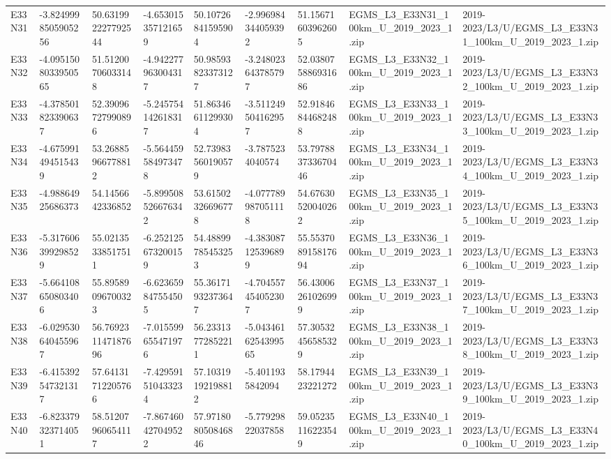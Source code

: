 \begin{landscape}
\begin{longtable}{lllllllll}
E33N31 & -3.8249998505905256 & 50.631992227792544 & -4.653015357121659 & 50.10726841595904 & -2.996984344059392 & 51.15671603962605 & EGMS\_L3\_E33N31\_100km\_U\_2019\_2023\_1.zip & 2019-2023/L3/U/EGMS\_L3\_E33N31\_100km\_U\_2019\_2023\_1.zip \\
E33N32 & -4.0951508033950565 & 51.51200706033148 & -4.942277963004317 & 50.98593823373127 & -3.248023643785797 & 52.038075886931686 & EGMS\_L3\_E33N32\_100km\_U\_2019\_2023\_1.zip & 2019-2023/L3/U/EGMS\_L3\_E33N32\_100km\_U\_2019\_2023\_1.zip \\
E33N33 & -4.378501823390637 & 52.39096727990896 & -5.245754142618317 & 51.86346611299304 & -3.511249504162957 & 52.91846844682488 & EGMS\_L3\_E33N33\_100km\_U\_2019\_2023\_1.zip & 2019-2023/L3/U/EGMS\_L3\_E33N33\_100km\_U\_2019\_2023\_1.zip \\
E33N34 & -4.675991494515439 & 53.26885966778812 & -5.564459584973478 & 52.73983560190579 & -3.7875234040574 & 53.797883733670446 & EGMS\_L3\_E33N34\_100km\_U\_2019\_2023\_1.zip & 2019-2023/L3/U/EGMS\_L3\_E33N34\_100km\_U\_2019\_2023\_1.zip \\
E33N35 & -4.98864925686373 & 54.1456642336852 & -5.899508526676342 & 53.61502326696778 & -4.077789987051118 & 54.67630520040262 & EGMS\_L3\_E33N35\_100km\_U\_2019\_2023\_1.zip & 2019-2023/L3/U/EGMS\_L3\_E33N35\_100km\_U\_2019\_2023\_1.zip \\
E33N36 & -5.317606399298529 & 55.02135338517511 & -6.252125673200159 & 54.48899785453253 & -4.383087125396899 & 55.553708915817694 & EGMS\_L3\_E33N36\_100km\_U\_2019\_2023\_1.zip & 2019-2023/L3/U/EGMS\_L3\_E33N36\_100km\_U\_2019\_2023\_1.zip \\
E33N37 & -5.664108650803406 & 55.89589096700323 & -6.623659847554505 & 55.36171932373647 & -4.704557454052307 & 56.43006261026999 & EGMS\_L3\_E33N37\_100km\_U\_2019\_2023\_1.zip & 2019-2023/L3/U/EGMS\_L3\_E33N37\_100km\_U\_2019\_2023\_1.zip \\
E33N38 & -6.029530640455967 & 56.769231147187696 & -7.015599655471976 & 56.23313772852211 & -5.0434616254399565 & 57.30532456585329 & EGMS\_L3\_E33N38\_100km\_U\_2019\_2023\_1.zip & 2019-2023/L3/U/EGMS\_L3\_E33N38\_100km\_U\_2019\_2023\_1.zip \\
E33N39 & -6.415392547321317 & 57.64131712205766 & -7.429591510433234 & 57.10319192198812 & -5.4011935842094 & 58.1794423221272 & EGMS\_L3\_E33N39\_100km\_U\_2019\_2023\_1.zip & 2019-2023/L3/U/EGMS\_L3\_E33N39\_100km\_U\_2019\_2023\_1.zip \\
E33N40 & -6.823379323714051 & 58.51207960654117 & -7.867460427049522 & 57.971808050846846 & -5.77929822037858 & 59.05235116223549 & EGMS\_L3\_E33N40\_100km\_U\_2019\_2023\_1.zip & 2019-2023/L3/U/EGMS\_L3\_E33N40\_100km\_U\_2019\_2023\_1.zip \\

\end{longtable}
\end{landscape}
